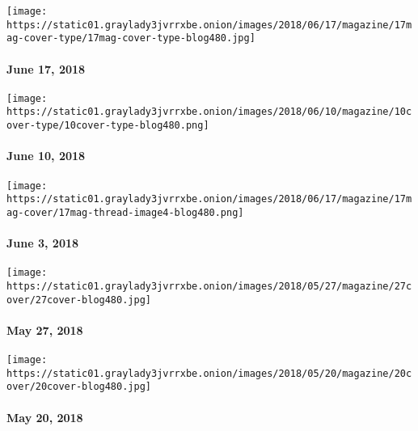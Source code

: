 \href{https://www.nytimes3xbfgragh.onion/issue/magazine/2018/06/14/61718-issue}{}

\texttt{[image: https://static01.graylady3jvrrxbe.onion/images/2018/06/17/magazine/17mag-cover-type/17mag-cover-type-blog480.jpg]}

\hypertarget{june-17-2018}{%
\paragraph{June 17, 2018}\label{june-17-2018}}

\href{https://www.nytimes3xbfgragh.onion/interactive/2018/06/07/magazine/new-york-love-city.html}{}

\texttt{[image: https://static01.graylady3jvrrxbe.onion/images/2018/06/10/magazine/10cover-type/10cover-type-blog480.png]}

\hypertarget{june-10-2018}{%
\paragraph{June 10, 2018}\label{june-10-2018}}

\href{https://www.nytimes3xbfgragh.onion/issue/magazine/2018/06/13/6318-issue}{}

\texttt{[image: https://static01.graylady3jvrrxbe.onion/images/2018/06/17/magazine/17mag-cover/17mag-thread-image4-blog480.png]}

\hypertarget{june-3-2018}{%
\paragraph{June 3, 2018}\label{june-3-2018}}

\href{https://www.nytimes3xbfgragh.onion/issue/magazine/2018/05/25/052718-issue}{}

\texttt{[image: https://static01.graylady3jvrrxbe.onion/images/2018/05/27/magazine/27cover/27cover-blog480.jpg]}

\hypertarget{may-27-2018}{%
\paragraph{May 27, 2018}\label{may-27-2018}}

\href{https://www.nytimes3xbfgragh.onion/issue/magazine/2018/05/25/052018-issue}{}

\texttt{[image: https://static01.graylady3jvrrxbe.onion/images/2018/05/20/magazine/20cover/20cover-blog480.jpg]}

\hypertarget{may-20-2018}{%
\paragraph{May 20, 2018}\label{may-20-2018}}

